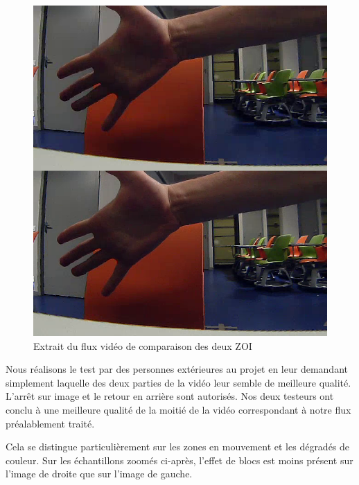 \documentclass[11pt,a4paper]{article}
\begin{document}
\begin{figure}[H]
\begin{center}
\includegraphics[scale=0.25]{images/comparaison_mosaique.png}
\end{center}
\caption{Extrait du flux vidéo de comparaison des deux ZOI}
\label{}
\end{figure}

\bigbreak
Nous réalisons le test par des personnes extérieures au projet en leur demandant simplement laquelle des deux parties de la vidéo leur semble de meilleure qualité.
L'arrêt sur image et le retour en arrière sont autorisés.
Nos deux testeurs ont conclu à une meilleure qualité de la moitié de la vidéo correspondant à notre flux préalablement traité.

\bigbreak
Cela se distingue particulièrement sur les zones en mouvement et les dégradés de couleur.
Sur les échantillons zoomés ci-après, l'effet de blocs est moins présent sur l'image de droite que sur l'image de gauche.
\end{document}
